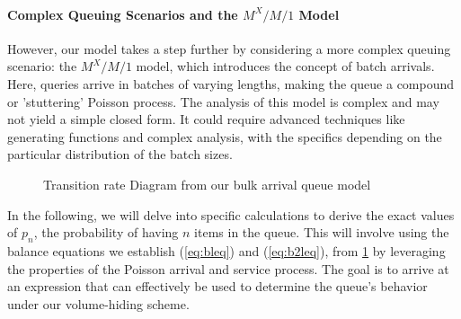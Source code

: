 \documentclass{article}
\begin{document}
\paragraph{Complex Queuing Scenarios and the $M^X/M/1$ Model}

However, our model takes a step further by considering a more complex queuing scenario: the $M^X/M/1$ model, which introduces the concept of batch arrivals. Here, queries arrive in batches of varying lengths, making the queue a compound or 'stuttering' Poisson process. The analysis of this model is complex and may not yield a simple closed form. It could require advanced techniques like generating functions and complex analysis, with the specifics depending on the particular distribution of the batch sizes.

\begin{figure}[H]
   \centering
\caption{Transition rate Diagram from our bulk arrival queue model}
    \label{fig:ctmc}
\end{figure}





In the following, we will delve into specific calculations to derive the exact values of $p_n$, the probability of having $n$ items in the queue. This will involve using the balance equations we establish (\ref{eq:bleq}) and (\ref{eq:b2leq}), from \ref{fig:ctmc} by leveraging the properties of the Poisson arrival and service process. The goal is to arrive at an expression that can effectively be used to determine the queue's behavior under our volume-hiding scheme.
\end{document}

